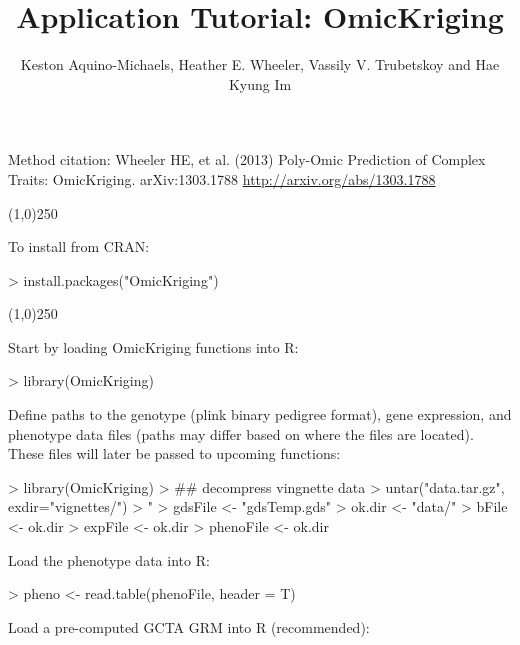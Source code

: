 \documentclass[a4paper]{article}
\title{Application Tutorial: OmicKriging}
\author{Keston Aquino-Michaels, Heather E. Wheeler, Vassily V. Trubetskoy and Hae Kyung Im}
\begin{document}

\maketitle
Method citation: Wheeler HE, et al. (2013) Poly-Omic Prediction of Complex Traits: OmicKriging. arXiv:1303.1788 \url{http://arxiv.org/abs/1303.1788}
\begin{center}
\line(1,0){250}
\end{center}
To install from CRAN:
\begin{Schunk}
\begin{Sinput}
> install.packages("OmicKriging")
\end{Sinput}
\end{Schunk}
\begin{center}
\line(1,0){250}
\end{center}
Start by loading OmicKriging functions into R:
\begin{Schunk}
\begin{Sinput}
> library(OmicKriging)
\end{Sinput}
\end{Schunk}
Define paths to the genotype (plink binary pedigree format), gene expression, and phenotype data files (paths may differ based on where the files are located). These files will later be passed to upcoming functions:
\begin{Schunk}

\begin{Schunk}
\begin{Sinput}
> library(OmicKriging)
> ## decompress vingnette data
> untar("data.tar.gz", exdir="vignettes/")
> "%&%" <- function(a, b) paste(a, b, sep="")
> gdsFile <- "gdsTemp.gds"
> ok.dir <- "data/"
> bFile <- ok.dir %&% "ig_genotypes"
> expFile <- ok.dir %&% "ig_gene_exon.txt"
> phenoFile <- ok.dir %&% "ig_pheno.txt"
\end{Sinput}
\end{Schunk}

\end{Schunk}
Load the phenotype data into R:
\begin{Schunk}

\begin{Schunk}
\begin{Sinput}
> pheno <- read.table(phenoFile, header = T)
\end{Sinput}
\end{Schunk}

\end{Schunk}
Load a pre-computed GCTA GRM into R (recommended):
\end{document}
